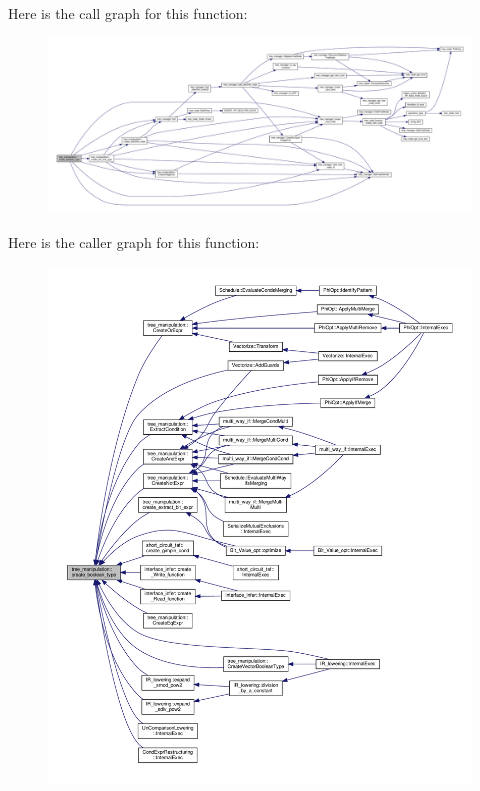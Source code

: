 Here is the call graph for this function\+:
\nopagebreak
\begin{figure}[H]
\begin{center}
\leavevmode
\includegraphics[width=350pt]{d0/d99/classtree__manipulation_a280d82a49475253523e487b0a68d77c1_cgraph}
\end{center}
\end{figure}
Here is the caller graph for this function\+:
\nopagebreak
\begin{figure}[H]
\begin{center}
\leavevmode
\includegraphics[width=350pt]{d0/d99/classtree__manipulation_a280d82a49475253523e487b0a68d77c1_icgraph}
\end{center}
\end{figure}
\mbox{\label{classtree__manipulation_a3aecb6c5af83ff4d96e6d970037d5c67}} 
